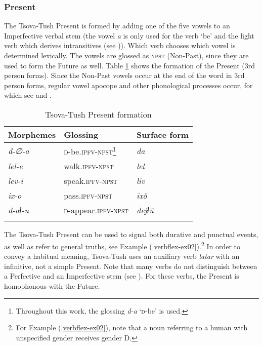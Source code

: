\subsubsection{Present}
\largerpage

The Tsova-Tush Present is formed by adding one of the five vowels to an Imperfective verbal stem (the vowel \textit{a} is only used for the verb `be' and the light verb which derives intransitives (see )). Which verb chooses which vowel is determined lexically. The vowels are glossed as \textsc{npst} (Non-Past), since they are used to form the Future as well. Table \ref{TAME-table1} shows the formation of the Present (3rd person forms). Since the Non-Past vowels occur at the end of the word in 3rd person forms, regular vowel apocope and other phonological processes occur, for which see  and \textcite{outtier99}.

\begin{table}
	\begin{tabular}{lll}
		\lsptoprule
		Morphemes & {Glossing} & {Surface form} \\
		\midrule
		\textit{d-∅-a} & \textsc{d}-be.\textsc{ipfv-npst}\footnote{Throughout this work, the glossing \textit{d-a} `\textsc{d}-be' is used.} & \textit{da}  \\
		\textit{lel-e} & walk.\textsc{ipfv-npst} & \textit{lel} \\
		\textit{lev-i} & speak.\textsc{ipfv-npst} & \textit{liv} \\
		\textit{ix-o} & pass.\textsc{ipfv-npst} & \textit{ix\u{o}} \\
		\textit{d-aɬ-u} & \textsc{d}-appear.\textsc{ipfv-npst} & \textit{dejɬ\u{u}} \\
		\lspbottomrule
	\end{tabular}
	\caption{Tsova-Tush Present formation}
	\label{TAME-table1}
\end{table}

The Tsova-Tush Present can be used to signal both durative and punctual events, as well as refer to general truths, see Example (\ref{verbflex-ex02}).\footnote{For Example (\ref{verbflex-ex02}), note that a noun referring to a human with unspecified gender receives gender D.} In order to convey a habitual meaning, Tsova-Tush uses an auxiliary verb \textit{latar} with an infinitive, not a simple Present. Note that many verbs do not distinguish between a Perfective and an Imperfective stem (see ). For these verbs, the Present is homophonous with the Future.



